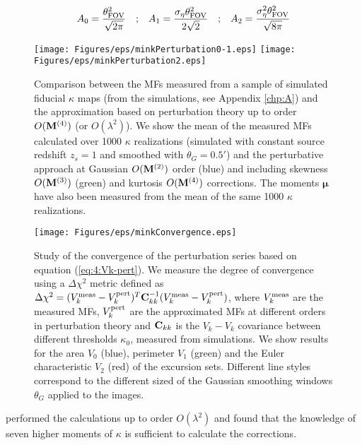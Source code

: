 \begin{equation}
\label{eq:4:amplitude}
\begin{matrix}
\displaystyle A_0 = \frac{\theta_{\rm FOV}^2}{\sqrt{2\pi}} & ; & \displaystyle A_1 = \frac{\sigma_\eta\theta_{\rm FOV}^2}{2\sqrt{2}} & ; & \displaystyle A_2 = \frac{\sigma_\eta^2\theta^2_{\rm FOV}}{\sqrt{8\pi}}
\end{matrix}
\end{equation}
%
\begin{figure}
\begin{center}
\texttt{[image: Figures/eps/minkPerturbation0-1.eps]}
\texttt{[image: Figures/eps/minkPerturbation2.eps]}
\end{center}
\caption{Comparison between the MFs measured from a sample of simulated fiducial $\kappa$ maps (from the  simulations, see Appendix \ref{chp:A}) and the approximation based on perturbation theory up to order $O(\mathbf{M}^{(4)})$ (or $O(\lambda^2)$). We show the mean of the measured MFs calculated over 1000 $\kappa$ realizations (simulated with constant source redshift $z_s=1$ and smoothed with $\theta_G=0.5'$) and the perturbative approach at Gaussian $O(\mathbf{M}^{(2)})$ order (blue) and including skewness $O(\mathbf{M}^{(3)})$ (green) and kurtosis $O(\mathbf{M}^{(4)})$ corrections. The moments $\pmb{\mu}$ have also been measured from the mean of the same 1000 $\kappa$ realizations.}
\label{fig:4:minkpert}
\end{figure}
%
\begin{figure}
\begin{center}
\texttt{[image: Figures/eps/minkConvergence.eps]}
\end{center}
\caption{Study of the convergence of the perturbation series based on equation (\ref{eq:4:Vk-pert}). We measure the degree of convergence using a $\Delta\chi^2$ metric defined as $\Delta\chi^2=(V_k^{\rm meas}-V_k^{\rm pert})^T\mathbf{C}_{kk}^{-1}(V_k^{\rm meas}-V_k^{\rm pert})$, where $V_k^{\rm meas}$ are the measured MFs, $V_k^{\rm pert}$ are the approximated MFs at different orders in perturbation theory and $\mathbf{C}_{kk}$ is the $V_k-V_k$ covariance between different thresholds $\kappa_0$, measured from simulations. We show results for the area $V_0$ (blue), perimeter $V_1$ (green) and the Euler characteristic $V_2$ (red) of the excursion sets. Different line styles correspond to the different sized of the Gaussian smoothing windows $\theta_G$ applied to the images.}
\label{fig:4:minkconv}
\end{figure}
%
\citep{Munshi12} performed the calculations up to order $O(\lambda^2)$ and found that the knowledge of seven higher moments of $\kappa$ is sufficient to calculate the corrections. 

